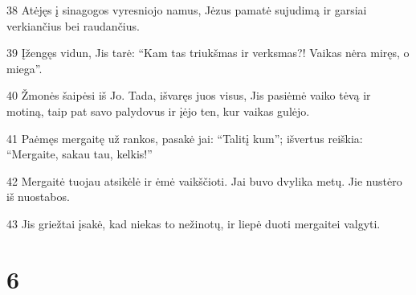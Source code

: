 \par 38 Atėjęs į sinagogos vyresniojo namus, Jėzus pamatė sujudimą ir garsiai verkiančius bei raudančius. 
\par 39 Įžengęs vidun, Jis tarė: “Kam tas triukšmas ir verksmas?! Vaikas nėra miręs, o miega”. 
\par 40 Žmonės šaipėsi iš Jo. Tada, išvaręs juos visus, Jis pasiėmė vaiko tėvą ir motiną, taip pat savo palydovus ir įėjo ten, kur vaikas gulėjo. 
\par 41 Paėmęs mergaitę už rankos, pasakė jai: “Talitį kum”; išvertus reiškia: “Mergaite, sakau tau, kelkis!” 
\par 42 Mergaitė tuojau atsikėlė ir ėmė vaikščioti. Jai buvo dvylika metų. Jie nustėro iš nuostabos. 
\par 43 Jis griežtai įsakė, kad niekas to nežinotų, ir liepė duoti mergaitei valgyti.



\chapter{6}


